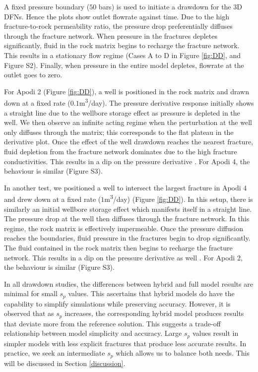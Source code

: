 \documentclass[draft]{agujournal2018}
\begin{document}
A fixed pressure boundary ($50$ bars) is used to initiate a drawdown for the 3D DFNs. Hence the plots show outlet flowrate against time. Due to the high fracture-to-rock permeability ratio, the pressure drop preferentially diffuses through the fracture network. When pressure in the fractures depletes significantly, fluid in the rock matrix begins to recharge the fracture network. This results in a stationary flow regime (Cases A to D in Figure \ref{fig:DD}, and Figure S2). Finally, when pressure in the entire model depletes, flowrate at the outlet goes to zero.

For Apodi 2 (Figure \ref{fig:DD}), a well is positioned in the rock matrix and drawn down at a fixed rate ($0.1$m\textsuperscript{3}/day). The pressure derivative response initially shows a straight line due to the wellbore storage effect as pressure is depleted in the well. We then observe an infinite acting regime when the perturbation at the well only diffuses through the matrix; this corresponds to the flat plateau in the derivative plot. Once the effect of the well drawdown reaches the nearest fracture, fluid depletion from the fracture network dominates due to the high fracture conductivities. This results in a dip on the pressure derivative \citep{Bourdet1989, Egya2018}. For Apodi 4, the behaviour is similar (Figure S3).

In another test, we positioned a well to intersect the largest fracture in Apodi 4 and drew down at a fixed rate ($1$m\textsuperscript{3}/day) (Figure \ref{fig:DD}). In this setup, there is similarly an initial wellbore storage effect which manifests itself in a straight line. The pressure drop at the well then diffuses through the fracture network. In this regime, the rock matrix is effectively impermeable. Once the pressure diffusion reaches the boundaries, fluid pressure in the fractures begin to drop significantly. The fluid contained in the rock matrix then begins to recharge the fracture network. This results in a dip on the pressure derivative as well \citep{Gringarten1987}. For Apodi 2, the behaviour is similar (Figure S3).

In all drawdown studies, the differences between hybrid and full model results are minimal for small $s_p$ values. This ascertains that hybrid models do have the capability to simplify simulations while preserving accuracy. However, it is observed that as $s_p$ increases, the corresponding hybrid model produces results that deviate more from the reference solution. This suggests a trade-off relationship between model simplicity and accuracy. Large $s_p$ values result in simpler models with less explicit fractures that produce less accurate results. In practice, we seek an intermediate $s_p$ which allows us to balance both needs. This will be discussed in Section \ref{discussion}.
\end{document}
